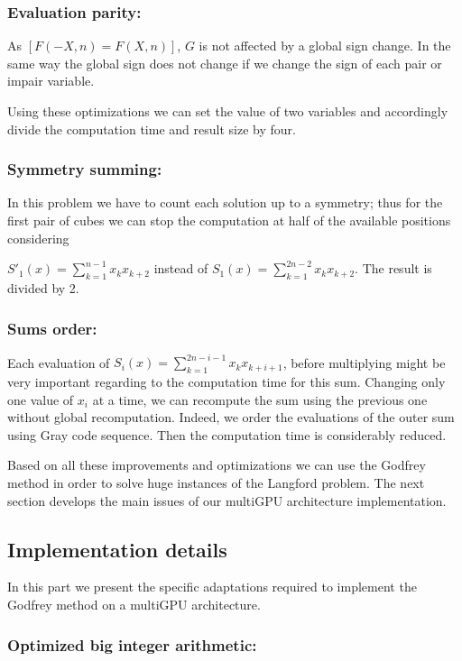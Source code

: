 \subsubsection{Evaluation parity: }
As $[F(-X,n) = F(X,n)]$, $G$ is not affected by a global sign change. 
In the same way the global sign does not change if we change the sign of each pair or impair variable.

Using these optimizations we can set the value of two variables and accordingly divide the computation time and result size by four.

\subsubsection{Symmetry summing: }
In this problem we have to count each solution up to a symmetry; thus for the first pair of cubes we can stop the computation at half of the available positions considering 

\noindent $S'_1(x) = \sum_{k=1}^{n-1}x_kx_{k+2}$ instead of $S_1(x) = \sum_{k=1}^{2n-2} x_kx_{k+2}$.
The result is divided by 2. 

\subsubsection{Sums order: }
Each evaluation of $ S_i(x) = \sum_{k=1}^{2n-i-1} x_kx_{k+i+1} $, before multiplying might be very important regarding to the computation time for this sum. 
Changing only one value of $ x_i $ at a time, we can recompute the sum using the previous one without global recomputation. 
Indeed, we order the evaluations of the outer sum using Gray code sequence. 
Then the computation time is considerably reduced.  

Based on all these improvements and optimizations we can use the Godfrey method in order to solve huge instances of the Langford problem. 
The next section develops the main issues of our multiGPU architecture implementation. 

\subsection{Implementation details}
In this part we present the specific adaptations required to implement the Godfrey method on a multiGPU architecture.

\subsubsection{Optimized big integer arithmetic: }

